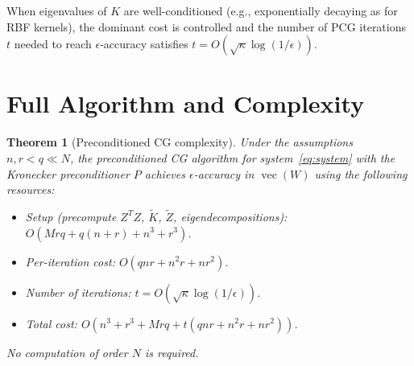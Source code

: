 \documentclass[11pt]{article}
\newtheorem{theorem}{Theorem}
\theoremstyle{definition}
\DeclareMathOperator{\vecop}{vec}
\begin{document}
When eigenvalues of $K$ are well-conditioned (e.g., exponentially decaying as for RBF kernels), the dominant cost is controlled and the number of PCG iterations $t$ needed to reach $\epsilon$-accuracy satisfies $t = O(\sqrt{\kappa}\log(1/\epsilon))$.

\section{Full Algorithm and Complexity}

\begin{theorem}[Preconditioned CG complexity]
  Under the assumptions $n, r < q \ll N$, the preconditioned CG algorithm for system~\eqref{eq:system} with the Kronecker preconditioner $P$ achieves $\epsilon$-accuracy in $\vecop(W)$ using the following resources:
  \begin{itemize}
    \item \emph{Setup} (precompute $Z^T Z$, $\tilde{K}$, $\tilde{Z}$, eigendecompositions): $O(Mrq + q(n+r) + n^3 + r^3)$.
    \item \emph{Per-iteration cost}: $O(qnr + n^2 r + nr^2)$.
    \item \emph{Number of iterations}: $t = O(\sqrt{\kappa}\log(1/\epsilon))$.
    \item \emph{Total cost}: $O(n^3 + r^3 + Mrq + t(qnr + n^2 r + nr^2))$.
  \end{itemize}
  No computation of order $N$ is required.
\end{theorem}
\end{document}
